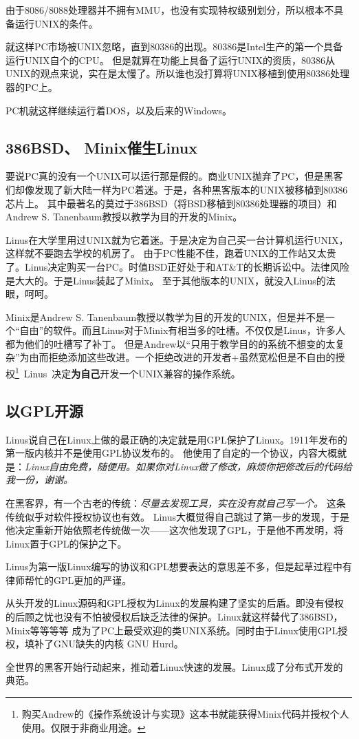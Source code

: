 由于8086/8088处理器并不拥有MMU，也没有实现特权级别划分，所以根本不具备运行UNIX的条件。

就这样PC市场被UNIX忽略，直到80386的出现。80386是Intel生产的第一个具备运行UNIX自个的CPU。
但是就算在功能上具备了运行UNIX的资质，80386从UNIX的观点来说，实在是太慢了。所以谁也没打算将UNIX移植到使用80386处理器的PC上。

PC机就这样继续运行着DOS，以及后来的Windows。

\subsection{386BSD、 Minix催生Linux}

要说PC真的没有一个UNIX可以运行那是假的。商业UNIX抛弃了PC，但是黑客们却像发现了新大陆一样为PC着迷。于是，各种黑客版本的UNIX被移植到80386芯片上。
其中最著名的莫过于386BSD（将BSD移植到80386处理器的项目）和Andrew S. Tanenbaum教授以教学为目的开发的Minix。

Linus在大学里用过UNIX就为它着迷。于是决定为自己买一台计算机运行UNIX，这样就不要跑去学校的机房了。
由于PC性能不佳，跑着UNIX的工作站又太贵了。Linus决定购买一台PC。时值BSD正好处于和AT\&T的长期诉讼中。法律风险是大大的。于是Linus装起了Minix。
至于其他版本的UNIX，就没入Linus的法眼，呵呵。

Minix是Andrew S. Tanenbaum教授以教学为目的开发的UNIX，但是并不是一个“自由”的软件。而且Linus对于Minix有相当多的吐槽。不仅仅是Linus，许多人都为他们的吐槽写了补丁。
但是Andrew以“只用于教学目的的系统不想变的太复杂”为由而拒绝添加这些改进。一个拒绝改进的开发者+虽然宽松但是不自由的授权\footnote{
购买Andrew的《操作系统设计与实现》这本书就能获得Minix代码并授权个人使用。仅限于非商业用途。}\textrightarrow ~Linus~决定\textbf{为自己}开发一个UNIX兼容的操作系统。


\subsection{以GPL开源}

Linus说自己在Linux上做的最正确的决定就是用GPL保护了Linux。1911年发布的第一版内核并不是使用GPL协议发布的。
他使用了自定的一个协议，内容大概就是：{\it Linux自由免费，随便用。如果你对Linux做了修改，麻烦你把修改后的代码给我一份，谢谢。}

在黑客界，有一个古老的传统：\emph{尽量去发现工具，实在没有就自己写一个。} 这条传统似乎对软件授权协议也有效。
%
Linus大概觉得自己跳过了第一步的发现，于是他决定重新开始依照老传统做一次——这次他发现了GPL，于是他不再发明，将Linux置于GPL的保护之下。

Linus为第一版Linux编写的协议和GPL想要表达的意思差不多，但是起草过程中有律师帮忙的GPL更加的严谨。

从头开发的Linux源码和GPL授权为Linux的发展构建了坚实的后盾。即没有侵权的后顾之忧也没有不怕被侵权后缺乏法律的保护。Linux就这样替代了386BSD，Minix等等等等
成为了PC上最受欢迎的类UNIX系统。同时由于Linux使用GPL授权，填补了GNU缺失的内核 GNU Hurd。

全世界的黑客开始行动起来，推动着Linux快速的发展。Linux成了分布式开发的典范。
